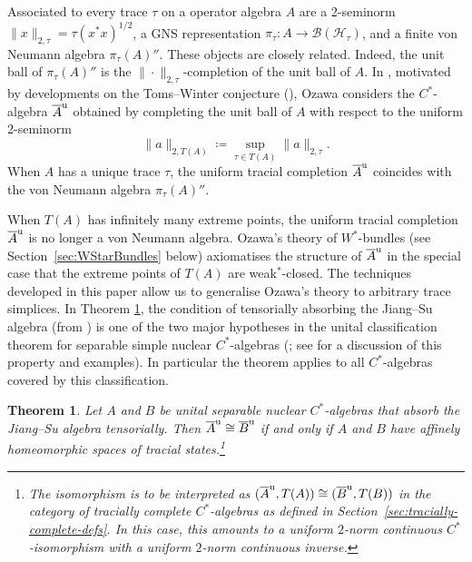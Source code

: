 \documentclass[a4paper,11pt]{amsart}
\newtheorem{theorem}{Theorem}
\theoremstyle{definition}
\numberwithin{equation}{section}
\numberwithin{theorem}{section}
\newcommand{\completion}[2]{\overline{#1}^{#2}}
\begin{document}
Associated to every trace $\tau$ on a operator algebra $A$ are a 2-seminorm $\|x\|_{2,\tau}=\tau(x^*x)^{1/2}$, a GNS representation $\pi_\tau\colon A \rightarrow \mathcal B(\mathcal H_\tau)$, and a finite von Neumann algebra $\pi_\tau(A)''$.  
These objects are closely related. Indeed, the unit ball of $\pi_\tau(A)''$ is the $\|\cdot\|_{2,\tau}$-completion of the unit ball of $A$. In \cite{Oz13}, motivated by developments on the Toms--Winter conjecture (\cite{KR14,TWW15,Sa12}), Ozawa considers the $C^*$-algebra $\completion{A}{\rm u}$ obtained by completing the unit ball of $A$ with respect to the uniform 2-seminorm
\begin{equation*}
    \|a\|_{2,T(A)}\coloneqq\sup_{\tau \in T(A)} \|a\|_{2,\tau}.
\end{equation*}
When $A$ has a unique trace $\tau$, the uniform tracial completion $\completion{A}{\rm u}$ coincides with the von Neumann algebra $\pi_\tau(A)''$. 

When $T(A)$ has infinitely many extreme points, the uniform tracial completion $\completion{A}{\rm u}$ is no longer a von Neumann algebra. Ozawa's theory of $W^*$-bundles (see Section~\ref{sec:WStarBundles} below) axiomatises the structure of $\completion{A}{\rm u}$ in the special case that the extreme points of $T(A)$ are weak$^*$-closed. The techniques developed in this paper allow us to generalise Ozawa's theory to arbitrary trace simplices.  In Theorem \ref{Main-A}, the condition of tensorially absorbing the Jiang--Su algebra (from \cite{JS99}) is one of the two major hypotheses in the unital classification theorem for separable simple nuclear $C^*$-algebras (\cite{GLN20a,GLN20b,EGLN15,TWW17,CGSTW}; see \cite[Section 1.1]{CGSTW} for a discussion of this property and examples).  In particular the theorem applies to all $C^*$-algebras covered by this classification.

\begin{theorem}\label{Main-A}
Let $A$ and $B$ be unital separable nuclear $C^*$-algebras that absorb the Jiang--Su algebra tensorially.  Then $\completion{A}{\rm u}\cong \completion{B}{\rm u}$ if and only if $A$ and $B$ have affinely homeomorphic spaces of tracial states.\footnote{The isomorphism is to be interpreted as $(\completion{A}{\rm u}, T(A)) \cong (\completion{B}{\rm u},T(B))$ in the category of tracially complete $C^*$-algebras as defined in Section~\ref{sec:tracially-complete-defs}. In this case, this amounts to a uniform $2$-norm continuous $C^*$-isomorphism with a uniform $2$-norm continuous inverse.\label{FootnoteThmA}}
\end{theorem}
\end{document}
